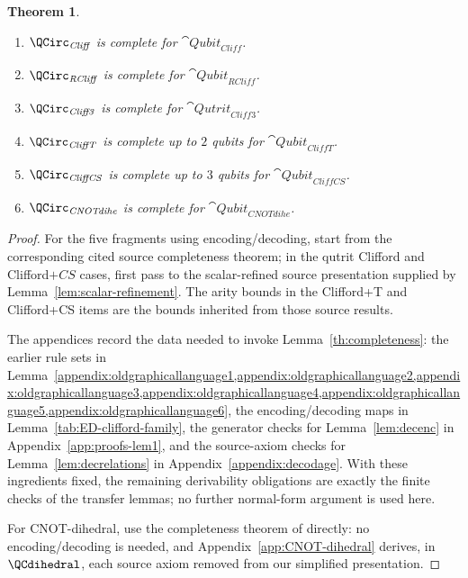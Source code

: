 \documentclass[10pt,a4paper]{article}
\newtheorem{theorem}{Theorem}
\def\cref#1{Lemma~\ref{#1}}%
\begin{document}
\begin{theorem}\label{cor:clifford-family-complete}
\begin{enumerate}
\item \(\QCirc_{\mathit{Cliff}}\) is complete for \(\cat{Qubit}_{\mathit{Cliff}}\).
\item \(\QCirc_{\mathit{RCliff}}\) is complete for \(\cat{Qubit}_{\mathit{RCliff}}\).
\item \(\QCirc_{\mathit{Cliff3}}\) is complete for \(\cat{Qutrit}_{\mathit{Cliff3}}\).
\item \(\QCirc_{\mathit{CliffT}}\) is complete up to \(2\) qubits for \(\cat{Qubit}_{\mathit{CliffT}}\).
\item \(\QCirc_{\mathit{CliffCS}}\) is complete up to \(3\) qubits for \(\cat{Qubit}_{\mathit{CliffCS}}\).
\item \(\QCirc_{\mathit{CNOTdihe}}\) is complete for \(\cat{Qubit}_{\mathit{CNOTdihe}}\).
\end{enumerate}
\end{theorem}


\begin{proof}
For the five fragments using encoding/decoding, start from the corresponding cited source
completeness theorem; in the qutrit Clifford and Clifford\(+CS\) cases, first pass to the
scalar-refined source presentation supplied by \cref{lem:scalar-refinement}.  The arity bounds in
the Clifford+T and Clifford+CS items are the bounds inherited from those source results.

The appendices record the data needed to invoke \cref{th:completeness}: the earlier rule sets in
\cref{appendix:oldgraphicallanguage1,appendix:oldgraphicallanguage2,appendix:oldgraphicallanguage3,appendix:oldgraphicallanguage4,appendix:oldgraphicallanguage5,appendix:oldgraphicallanguage6},
the encoding/decoding maps in \cref{tab:ED-clifford-family}, the generator checks for
\cref{lem:decenc} in Appendix~\ref{app:proofs-lem1}, and the source-axiom checks for
\cref{lem:decrelations} in Appendix~\ref{appendix:decodage}.  With these ingredients fixed, the
remaining derivability obligations are exactly the finite checks of the transfer lemmas; no further
normal-form argument is used here.

For CNOT-dihedral, use the completeness theorem of \cite{AmyCNOTDihedral} directly: no
encoding/decoding is needed, and Appendix~\ref{app:CNOT-dihedral} derives, in \(\QCdihedral\),
each source axiom removed from our simplified presentation.
\end{proof}
\end{document}
